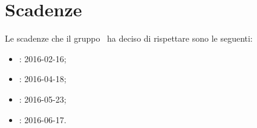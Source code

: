 \documentclass[../PianoProgetto.tex]{subfiles}
\begin{document}
\section{Scadenze}
		Le scadenze che il gruppo \leaf\ ha deciso di rispettare sono le seguenti:
		\begin{itemize}
		\item \revisionedeirequisiti : 2016-02-16;
		\item \revisionediprogettazione : 2016-04-18;
		\item \revisionediqualifica : 2016-05-23;
		\item \revisionediaccettazione : 2016-06-17.
		\end{itemize}
\end{document}
